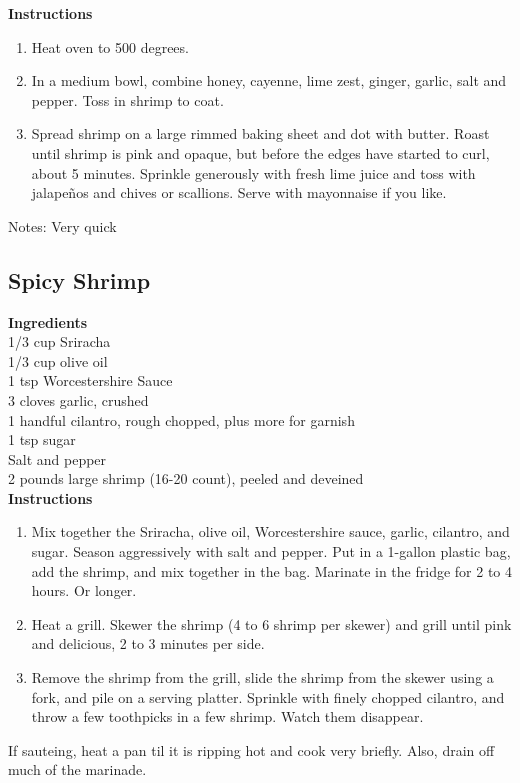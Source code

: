 \documentclass{article}
\numberwithin{figure}{section}
\numberwithin{equation}{section}
\begin{document}
{\bf Instructions}
\begin{enumerate}
\item Heat oven to 500 degrees. 
\item In a medium bowl, combine honey, cayenne, lime zest, ginger, garlic, salt and pepper. Toss in shrimp to coat.
\item Spread shrimp on a large rimmed baking sheet and dot with butter. Roast until shrimp is pink and opaque, but before the edges have started to curl, about 5 minutes. Sprinkle generously with fresh lime juice and toss with jalapeños and chives or scallions. Serve with mayonnaise if you like. 
\end{enumerate}

Notes: Very quick

\pagebreak
\subsection{Spicy Shrimp}
{\bf Ingredients}\\
1/3 cup Sriracha\\
1/3 cup olive oil\\
1 tsp Worcestershire Sauce\\
3 cloves garlic, crushed\\
1 handful cilantro, rough chopped, plus more for garnish\\
1 tsp sugar\\
Salt and pepper\\
2 pounds large shrimp (16-20 count), peeled and deveined\\

{\bf Instructions}
\begin{enumerate}
\item Mix together the Sriracha, olive oil, Worcestershire sauce, garlic, cilantro, and sugar. Season aggressively with salt and pepper. Put in a 1-gallon plastic bag, add the shrimp, and mix together in the bag. Marinate in the fridge for 2 to 4 hours. Or longer.
\item Heat a grill. Skewer the shrimp (4 to 6 shrimp per skewer) and grill until pink and delicious, 2 to 3 minutes per side.
\item Remove the shrimp from the grill, slide the shrimp from the skewer using a fork, and pile on a serving platter. Sprinkle with finely chopped cilantro, and throw a few toothpicks in a few shrimp. Watch them disappear.
\end{enumerate}

If sauteing, heat a pan til it is ripping hot and cook very briefly. Also, drain off much of the marinade.
\end{document}

